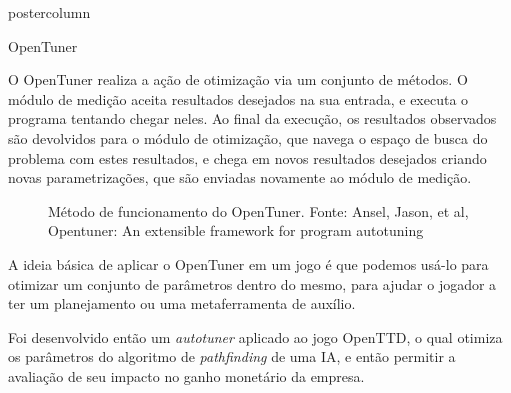 \documentclass[final]{beamer}
\begin{document}
\begin{frame}
\begin{columns}
\begin{column}{.5\textwidth}
\begin{beamercolorbox}[center,wd=\textwidth]{postercolumn}
\begin{minipage}[T]{.95\textwidth}
{\begin{block}{OpenTuner}
                \vspace*{0.2cm}
                
                O OpenTuner realiza a ação de otimização via um conjunto de métodos. O módulo de medição aceita resultados desejados na sua entrada, e executa o programa tentando chegar neles. Ao final da execução, os resultados observados são devolvidos para o módulo de otimização, que navega o espaço de busca do problema com estes resultados, e chega em novos resultados desejados criando novas parametrizações, que são enviadas novamente ao módulo de medição.
                
                \vspace*{0.4cm} 
                
                
                \begin{figure}[h]
                  \caption{Método de funcionamento do OpenTuner.
                    Fonte: Ansel, Jason, et al, Opentuner: An extensible framework for program autotuning}
                \end{figure}
                
                \vspace*{0.2cm} 
                
                 A ideia básica  de aplicar o OpenTuner em um jogo é que podemos usá-lo para otimizar um conjunto de parâmetros dentro do mesmo, para ajudar o jogador a ter um planejamento ou uma metaferramenta de auxílio.
                 
                 \vspace*{0.2cm} 
                 
                 Foi desenvolvido então um \textit{autotuner} aplicado ao jogo OpenTTD, o qual otimiza os parâmetros do algoritmo de \textit{pathfinding} de uma IA, e então permitir a avaliação de seu impacto no ganho monetário da empresa. 
                               

\end{block}}
\end{minipage}
\end{beamercolorbox}
\end{column}
\end{columns}
\end{frame}
\end{document}
